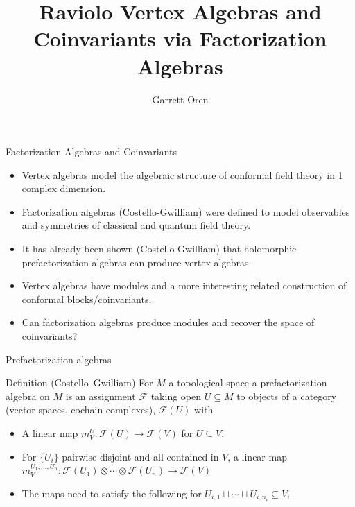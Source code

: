 \documentclass{beamer}
\title[About Beamer] %
{Raviolo Vertex Algebras and Coinvariants via Factorization Algebras}
\author[Garrett Oren] %
{Garrett Oren}
\begin{document}
\frame{\titlepage}
\begin{frame}{Factorization Algebras and Coinvariants}
\begin{itemize}
    \item Vertex algebras model the algebraic structure of conformal field theory in 1 complex dimension.
    \pause
    \item Factorization algebras (Costello-Gwilliam) were defined to model observables and symmetries of classical and quantum field theory.
    \pause
    \item It has already been shown (Costello-Gwilliam) that holomorphic prefactorization algebras can produce vertex algebras.
    \pause
    \item Vertex algebras have modules and a more interesting related construction of conformal blocks/coinvariants.
    \pause
    \item Can factorization algebras produce modules and recover the space of coinvariants?
\end{itemize}
\end{frame}

\begin{frame}[fragile]{Prefactorization algebras}
    \begin{block}{Definition (Costello--Gwilliam)}
        For $M$ a topological space a prefactorization algebra on $M$ is an assignment $\mathcal{F}$ taking open $U \subseteq M$ to objects of a category (vector spaces, cochain complexes), $\mathcal{F}(U)$ with
        \begin{itemize}
            \item A linear map $m^{U}_V :\mathcal{F}(U) \to \mathcal{F}(V)$ for $U\subseteq V$.
            \item For $\{U_i\}$ pairwise disjoint and all contained in $V$, a linear map $m_V^{U_1,\dots,U_n} : \mathcal{F}(U_1)\otimes \dotsb \otimes \mathcal{F}(U_n) \to \mathcal{F}(V)$
            \item The maps need to satisfy the following for $U_{i,1} \sqcup \dotsb \sqcup U_{i,n_i}\subseteq V_i$

        \end{itemize}
    \end{block}
\end{frame}
\end{document}
